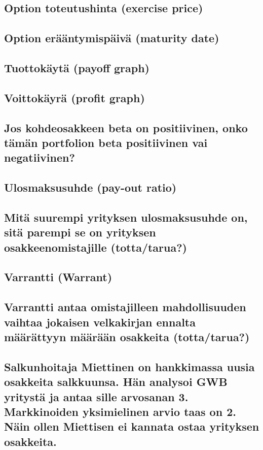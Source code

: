 \documentclass[a4paper]{article}
\begin{document}
\subsection{Option toteutushinta (exercise price)}

\subsection{Option erääntymispäivä (maturity date)}

\subsection{Tuottokäytä (payoff graph)}

\subsection{Voittokäyrä (profit graph)}

\subsection{Jos kohdeosakkeen beta on positiivinen, onko tämän portfolion beta positiivinen vai negatiivinen?}

\subsection{Ulosmaksusuhde (pay-out ratio)}

\subsection{Mitä suurempi yrityksen ulosmaksusuhde on, sitä parempi se on yrityksen osakkeenomistajille (totta/tarua?)}

\subsection{Varrantti (Warrant)}

\subsection{Varrantti antaa omistajilleen mahdollisuuden vaihtaa jokaisen velkakirjan ennalta määrättyyn määrään osakkeita (totta/tarua?)}

\subsection{Salkunhoitaja Miettinen on hankkimassa uusia osakkeita salkkuunsa. Hän analysoi GWB yritystä ja antaa sille arvosanan 3. Markkinoiden yksimielinen arvio taas on 2. Näin ollen Miettisen ei kannata ostaa yrityksen osakkeita.}
\end{document}
